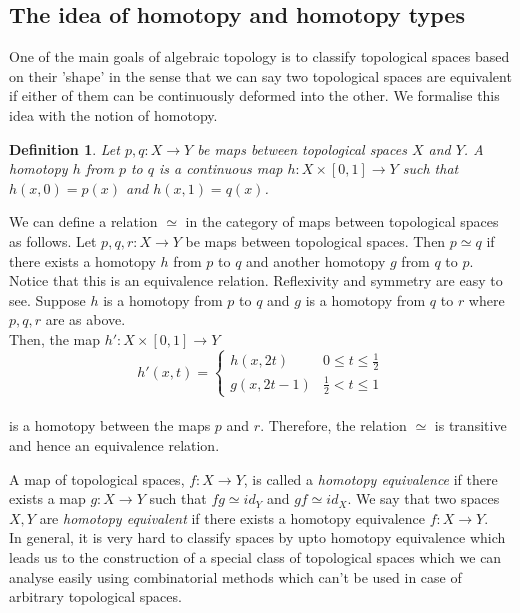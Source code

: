 \documentclass[12pt]{extarticle}
\numberwithin{equation}{section}
\newtheorem{defn}[thm]{Definition}
\begin{document}
\subsection{The idea of homotopy and homotopy types}
One of the main goals of algebraic topology is to classify topological spaces based on their 'shape' in the sense that we can say two topological spaces are equivalent if either of them can be continuously deformed into the other. We formalise this idea with the notion of homotopy.


\begin{defn}
Let $p,q:X\to Y$ be maps between topological spaces $X$ and $Y$. A homotopy $h$ from $p$ to $q$ is a continuous map $h : X \times [0,1] \to Y$ such that $h(x,0) = p(x)$ and $h(x,1) = q(x)$.\\
\end{defn}

We can define a relation $\simeq$ in the category of maps between topological spaces as follows. Let $p,q,r:X\to Y$ be maps between topological spaces. Then $p\simeq q$ if there exists a homotopy $h$ from $p$ to $q$ and another homotopy $g$ from $q$ to $p$. Notice that this is an equivalence relation. Reflexivity and symmetry are easy to see. Suppose $h$ is a homotopy from $p$ to $q$ and $g$ is a homotopy from $q$ to $r$ where $p,q,r$ are as above.\\
Then, the map $h':X\times [0,1]\to Y$ 
\[h'(x,t)=\begin{cases}
        h(x,2t) & 0\leq t\leq \frac{1}{2}\\
        g(x,2t-1) & \frac{1}{2}< t \leq 1
\end{cases}\]\\

is a homotopy between the maps $p$ and $r$. Therefore, the relation $\simeq$ is transitive and hence an equivalence relation.

A map of topological spaces, $f:X\to Y$, is called a \emph{homotopy equivalence} if there exists a map $g:X\to Y$ such that $fg\simeq id_Y$ and $gf\simeq id_X$. We say that two spaces $X,Y$ are \emph{homotopy equivalent} if there exists a homotopy equivalence $f:X\to Y$.\\

 In general, it is very hard to classify spaces by upto homotopy equivalence which leads us to the construction of a special class of topological spaces which we can analyse easily using combinatorial methods which can't be used in case of arbitrary topological spaces.\\
\end{document}
